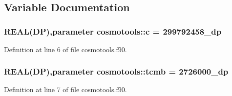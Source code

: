 \subsection{Variable Documentation}
\hypertarget{namespacecosmotools_af8ddc547a2b8ba207873dbc3e349b2c8}{
\subsubsection[{c}]{\setlength{\rightskip}{0pt plus 5cm}REAL(DP),parameter {\bf cosmotools::c} = 299792458\_\-dp}}
\label{namespacecosmotools_af8ddc547a2b8ba207873dbc3e349b2c8}


Definition at line 6 of file cosmotools.f90.

\hypertarget{namespacecosmotools_a80c53b710983b0f2be212c0fcbed9add}{
\subsubsection[{tcmb}]{\setlength{\rightskip}{0pt plus 5cm}REAL(DP),parameter {\bf cosmotools::tcmb} = 2726000\_\-dp}}
\label{namespacecosmotools_a80c53b710983b0f2be212c0fcbed9add}


Definition at line 7 of file cosmotools.f90.

